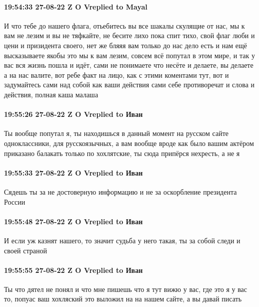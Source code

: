 \paragraph{19:54:33 27-08-22 Z O Vreplied to Mayal}

И что тебе до нашего флага, отьебитесь вы все шакалы скулящие от нас, мы к вам
не лезим и вы не тяфкайте, не бесите лихо пока спит тихо, свой флаг люби и цени
и призидента своего, нет же бляяя вам только до нас дело есть и нам ещё
высказываете якобы это мы к вам лезим, совсем всё попутал в этом мире, и так у
вас вся жизнь пошла и идёт, сами не понимаете что несёте и делаете, вы делаете
а на нас валите, вот ребе факт на лицо, как с этими коментами тут, вот и
задумайтесь сами над собой как ваши действия сами себе противоречат и слова и
действия, полная каша малаша

\paragraph{19:55:26 27-08-22 Z O Vreplied to Иван}

Ты вообще попутал я, ты находишься в данный момент на русском сайте
одноклассники, для русскоязычных, а вам вообще вроде как было вашим актёром
приказано балакать только по хохлятские, ты сюда припёрся нехресть, а не я

\paragraph{19:55:33 27-08-22 Z O Vreplied to Иван}

Сядешь ты за не достоверную информацию и не за оскорбление президента России

\paragraph{19:55:48 27-08-22 Z O Vreplied to Иван}

И если уж казнят нашего, то значит судьба у него такая, ты за собой следи и своей страной

\paragraph{19:55:55 27-08-22 Z O Vreplied to Иван}

Ты что дятел не понял и что мне пишешь что я тут вижю у вас, где это я у вас
то, попуас ваш хохляский это выложил на на нашем сайте, а вы давай писать

